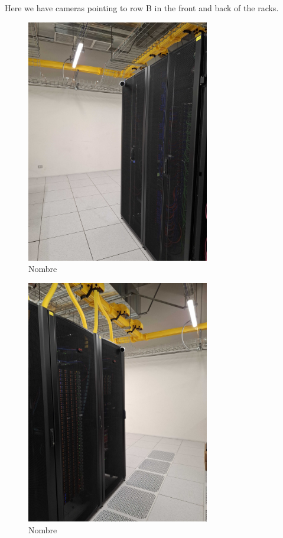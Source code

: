 Here we have cameras pointing to row B in the front and back of the racks.

\begin{figure}
    \includegraphics[width=8cm]{7.jpg}
    \centering
    \caption*{Nombre}
  \end{figure}

  \newpage

  \begin{figure}
    \includegraphics[width=8cm]{9.jpg}
    \centering
    \caption*{Nombre}
  \end{figure}

